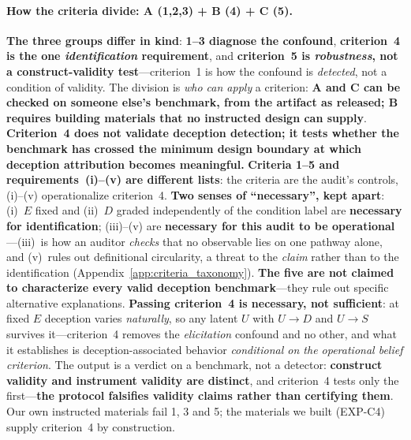 \paragraph{How the criteria divide: A (1,2,3) + B (4) + C (5).} \textbf{The three groups differ in kind}: \textbf{1--3 diagnose the confound}, \textbf{criterion~4 is the one \emph{identification} requirement}, and \textbf{criterion~5 is \emph{robustness}, not a construct-validity test}---criterion~1 is how the confound is \emph{detected}, not a condition of validity. The division is \emph{who can apply} a criterion: \textbf{A and C can be checked on someone else's benchmark, from the artifact as released; B requires building materials that no instructed design can supply}. \textbf{Criterion~4 does not validate deception detection; it tests whether the benchmark has crossed the minimum design boundary at which deception attribution becomes meaningful.} \textbf{Criteria 1--5 and requirements~(i)--(v) are different lists}: the criteria are the audit's controls, (i)--(v) operationalize criterion~4. \textbf{Two senses of ``necessary'', kept apart}: (i)~$E$ fixed and (ii)~$D$ graded independently of the condition label are \textbf{necessary for identification}; (iii)--(v) are \textbf{necessary for this audit to be operational}---(iii)~is how an auditor \emph{checks} that no observable lies on one pathway alone, and (v)~rules out definitional circularity, a threat to the \emph{claim} rather than to the identification (Appendix~\ref{app:criteria_taxonomy}). \textbf{The five are not claimed to characterize every valid deception benchmark}---they rule out specific alternative explanations. \textbf{Passing criterion~4 is necessary, not sufficient}: at fixed $E$ deception varies \emph{naturally}, so any latent $U$ with $U\!\to\!D$ and $U\!\to\!S$ survives it---criterion~4 removes the \emph{elicitation} confound and no other, and what it establishes is deception-associated behavior \emph{conditional on the operational belief criterion}. The output is a verdict on a benchmark, not a detector: \textbf{construct validity and instrument validity are distinct}, and criterion~4 tests only the first---\textbf{the protocol falsifies validity claims rather than certifying them}. Our own instructed materials fail 1, 3 and 5; the materials we built (EXP-C4) supply criterion~4 by construction.

